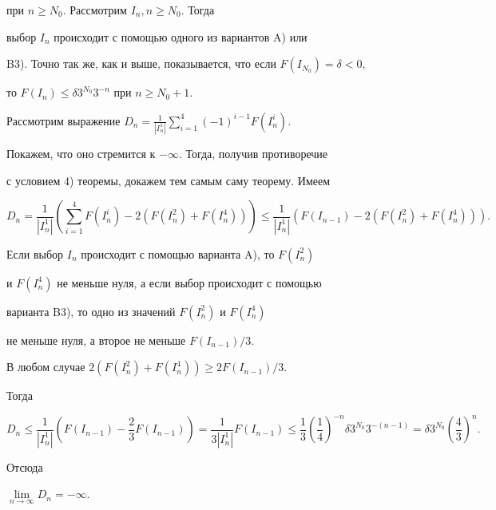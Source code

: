 \begin{pf}
при $n\ge N_{0}$. Рассмотрим $I_{n},n\ge N_{0}$. Тогда


выбор $I_{n}$ происходит с помощью одного из вариантов A) или


B3). Точно так же, как и выше, показывается, что если $F(I_{N_{0}})=\delta<0$,


то $F(I_{n})\le \delta 3^{N_{0}}3^{-n}$ при $n\ge N_{0}+1$.


Рассмотрим выражение $D_n=\frac{1}{| I^{1}_{n}| }


\sum\limits_{i=1}^{4}({-1})^{i-1}F(I^{i}_{n})$.


Покажем, что оно стремится к $-\infty $. Тогда, получив противоречие


с условием 4) теоремы, докажем тем самым саму теорему. Имеем 


$$


D_n=\frac{1}{| I^{1}_{n}| }


\left(\sum\limits_{i=1}^{4}F(I^{i}_{n})-2(F(I^{2}_{n})+F(I^{4}_{n}))


\right)\le \frac{1}{| I^{1}_{n}| }(F(I_{n-1})


-2(F(I^{2}_{n})+F(I^{4}_{n}))).


$$





Если выбор $I_{n}$ происходит с помощью варианта A), то $F(I^{2}_{n})$


и $F(I^{4}_{n})$ не меньше нуля, а если выбор происходит с помощью


варианта B3), то одно из значений $F(I^{2}_{n})$ и $F(I^{4}_{n})$


не меньше нуля, а второе не меньше $F(I_{n-1})/3$.


В любом случае $2(F(I^{2}_{n})+F(I^{4}_{n})) \ge 2F(I_{n-1})/3$.





Тогда 


$$


D_n\le \frac{1}{\left| I^{1}_{n}\right| }\left(F(I_{n-1})-


\frac{2}{3}F(I_{n-1})\right) = 


\frac{1}{3\left| I^{1}_{n}\right| }


F(I_{n-1})\le \frac{1}{3}


\left(\frac{1}{4}\right) ^{-n}\delta 3^{N_{0}}3^{-(n-1)}=


\delta 3^{N_{0}}\left(\frac{4}{3}\right) ^{n}.


$$


Отсюда 


$\lim\limits_{n\rightarrow \infty }D_n={-\infty}$.


\end{pf}








